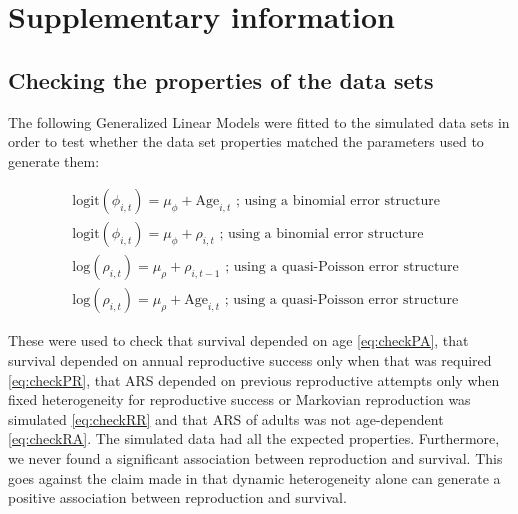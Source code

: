 \printbibliography[heading=subbibliography]

\newpage
\section{Supplementary information}

\subsection{Checking the properties of the data sets}\label{ap:chpro}
The following Generalized Linear Models were fitted to the simulated data sets in order to test whether the data set properties matched the parameters used to generate them:

\begin{subequations}\label{eq:check}
\begin{align}
&\mathrm{logit}(\phi_{i,t})=\mu_{\phi}+\mathrm{Age}_{i,t}\label{eq:checkPA}\text{ ; using a binomial error structure}\\
&\mathrm{logit}(\phi_{i,t})=\mu_{\phi}+\rho_{i,t}\label{eq:checkPR}\text{ ; using a binomial error structure}\\
&\mathrm{log}(\rho_{i,t}) =\mu_{\rho}+ \rho_{i,t-1}\label{eq:checkRR}\text{ ; using a quasi-Poisson error structure}\\
&\mathrm{log}(\rho_{i,t}) =\mu_{\rho}+ \mathrm{Age}_{i,t}\label{eq:checkRA}\text{ ; using a quasi-Poisson error structure}
\end{align}
\end{subequations}

These were used to check that survival depended on age \eqref{eq:checkPA}, that survival depended on annual reproductive success only when that was required \eqref{eq:checkPR}, that ARS depended on previous reproductive attempts only when fixed heterogeneity for reproductive success or Markovian reproduction was simulated \eqref{eq:checkRR} and that ARS of adults was not age-dependent \eqref{eq:checkRA}. The simulated data had all the expected properties. Furthermore, we never found a significant association between reproduction and survival. This goes against the claim made in \cite{Steiner2010} that dynamic heterogeneity alone can generate a positive association between reproduction and survival.


